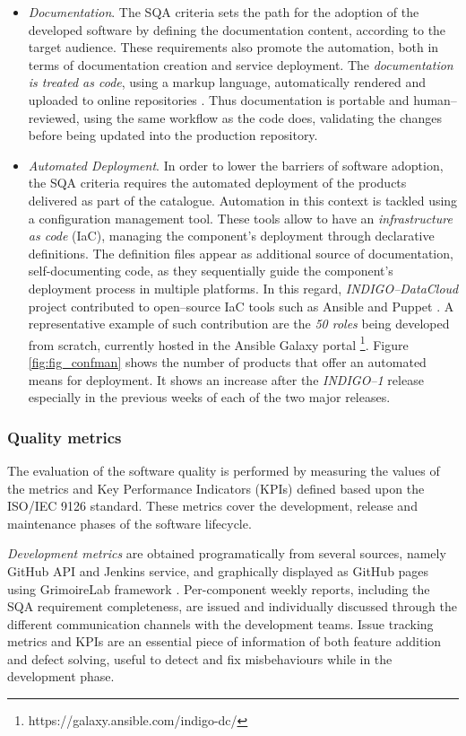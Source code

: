 \documentclass[journal]{IEEEtran}
\begin{document}
\begin{itemize}
\item \textit{Documentation}.
The SQA criteria sets the path for the adoption of the developed software by
defining the documentation content, according to the target audience. These requirements also 
promote the automation, both in terms of documentation creation and service deployment. The
\textit{documentation is treated as code}, using a markup language, automatically rendered and
uploaded to online repositories \cite{indigo-gitbook}. Thus documentation is portable and 
human--reviewed, using the same workflow as the code does, validating the changes before being
updated into the production repository. 

\item \textit{Automated Deployment}.
In order to lower the barriers of software adoption, the SQA criteria requires the automated 
deployment of the products delivered as part of the catalogue. Automation in this context is 
tackled using a configuration management tool. These tools allow to have an 
\textit{infrastructure as code} (IaC), managing the component's deployment through declarative
definitions. The definition files appear as additional source of documentation, 
self-documenting code, as they sequentially guide the component's deployment process in multiple
platforms. In this regard, {\sl INDIGO--DataCloud} project contributed to open--source IaC tools such 
as Ansible \cite{indigo-ansible} and Puppet \cite{indigo-puppet}. A representative example of 
such contribution are the \textit{50 roles} being developed from scratch, currently hosted in
the Ansible Galaxy portal \footnote{https://galaxy.ansible.com/indigo-dc/}. Figure 
\ref{fig:fig_confman} shows the number of products that offer an automated means for deployment.
It shows an increase after the {\sl INDIGO--1} release especially in the previous weeks of each
of the two major releases.
\end{itemize}

\subsubsection{Quality metrics}

The evaluation of the software quality is performed by measuring the values of
the metrics and Key Performance Indicators (KPIs) defined based upon the
ISO/IEC 9126 standard. These metrics cover the development, release and
maintenance phases of the software lifecycle. 

\textit{Development metrics} are obtained programatically from several sources, namely GitHub
API and Jenkins service, and graphically displayed as GitHub pages using GrimoireLab
framework \cite{grimoirelab}. Per-component weekly reports, including the SQA requirement
completeness, are issued and individually discussed through the different communication channels
with the development teams. Issue tracking metrics and KPIs are an essential piece of information
of both feature addition and defect solving, useful to detect and fix misbehaviours while in the
development phase. 
\end{document}
